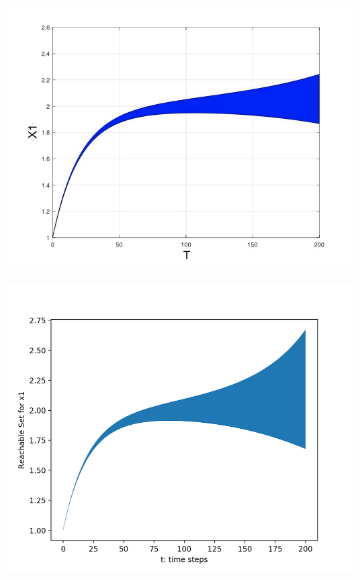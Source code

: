 \documentclass[EPiC]{easychair}
\begin{document}
\begin{figure}[h]
    \hspace{-12ex}
    \begin{subfigure}{0.6\textwidth}
    \centering
    \includegraphics[width=1.15\textwidth]{SapoFigures/Phos/SapoKaa_X1.jpg}
    \end{subfigure}
    \begin{subfigure}{0.6\textwidth}
    \centering
    \includegraphics[width=1.12\textwidth]{SapoFigures/Phos/KaaPhos_X1.png}
    \end{subfigure}
    

\end{figure}
\end{document}
